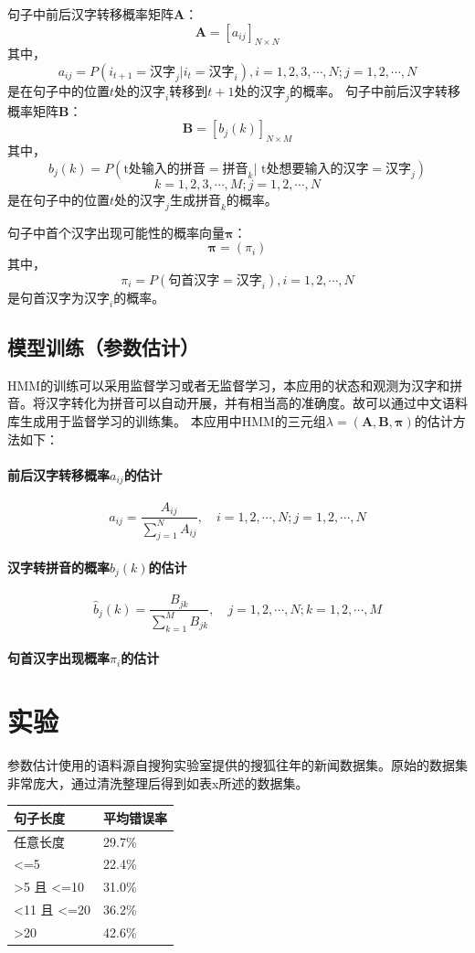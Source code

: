 \documentclass[12pt,a4paper,draft]{ctexart}
\begin{document}
句子中前后汉字转移概率矩阵$\bm{A}$：
\[ \bm{A}=[a_{ij}]_{N\times N} \]
其中，
\[ a_{ij}=P(i_{t+1}=\mbox{汉字}_j|i_t=\mbox{汉字}_i),  i=1,2,3,\cdots,N; j=1,2,\cdots,N\]
是在句子中的位置$ t $处的$ \mbox{汉字}_i $转移到$ t+1 $处的$ \mbox{汉字}_j $的概率。
句子中前后汉字转移概率矩阵$\bm{B}$：
\[ \bm{B}=[b_j(k)]_{N\times M} \]
其中，
\[ b_j(k)=P(\mbox{t处输入的拼音}=\mbox{拼音}_k|\mbox{ t处想要输入的汉字}=\mbox{汉字}_j) \]
\[ k=1,2,3,\cdots,M; j=1,2,\cdots,N\]
是在句子中的位置$ t $处的$ \mbox{汉字}_j $生成$ \mbox{拼音}_k $的概率。

句子中首个汉字出现可能性的概率向量$\bm{\pi}$：
\[ \bm{\pi}=(\pi_i) \]
其中，
\[ \pi_i=P(\mbox{句首汉字}=\mbox{汉字}_i), i=1,2,\cdots,N \]
是句首汉字为$\mbox{汉字}_i$的概率。
\subsection{模型训练（参数估计）}
HMM的训练可以采用监督学习或者无监督学习\cite{李航统计学习}，本应用的状态和观测为汉字和拼音。将汉字转化为拼音可以自动开展\cite{python-pinyin}，并有相当高的准确度\cite{accuracy-of-auto-pinyin}。故可以通过中文语料库生成用于监督学习的训练集。
本应用中HMM的三元组$ \lambda=(\bm{A},\bm{B},\bm{\pi}) $的估计方法如下：
\paragraph{前后汉字转移概率$a_{ij}$的估计}
\[ \hat{a}_{i j}=\frac{A_{ij}}{\sum_{j=1}^{N} A_{i j}}, \quad i=1,2, \cdots, N ; j=1,2, \cdots, N \]
\paragraph{汉字转拼音的概率$b_j(k)$的估计}
\[ \hat{b}_{j}(k)=\frac{B_{j k}}{\sum_{k=1}^{M} B_{j k}}, \quad j=1,2, \cdots, N ; k=1,2, \cdots, M \]
\paragraph{句首汉字出现概率$\pi_i$的估计}


\section{实验}
参数估计使用的语料源自搜狗实验室提供的搜狐往年的新闻数据集\cite{SogouCS}。原始的数据集非常庞大，通过清洗整理后得到如表x所述的数据集。


\begin{table}[]
	\begin{tabular}{@{}ll@{}}
		\toprule
		句子长度 & 平均错误率 \\ \midrule
		任意长度 & 29.7\% \\
		\textless{}=5 & 22.4\% \\
		\textgreater{}5 且 \textless{}=10 & 31.0\% \\
		\textless{}11 且 \textless{}=20 & 36.2\% \\
		\textgreater{}20 & 42.6\% \\ \bottomrule
	\end{tabular}
\end{table}
\end{document}
